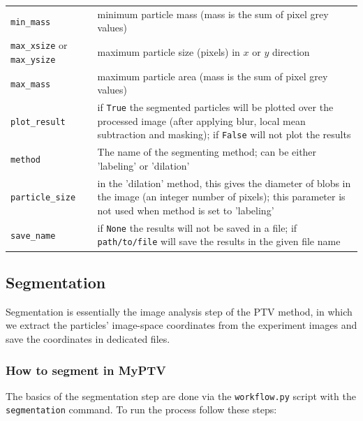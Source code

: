 \documentclass[10pt,a4paper]{article}
\begin{document}
\begin{table}[!ht]
\begin{tabular}{l m{13cm}}
		\texttt{min\_mass} & minimum particle mass (mass is the sum of pixel grey values)\\[.3em]
		
		\texttt{max\_xsize} or \texttt{max\_ysize} & maximum particle size (pixels) in $x$ or $y$ direction \\[.3em]
		
		\texttt{max\_mass} & maximum particle area (mass is the sum of pixel grey values) \\[.3em]
		
		\texttt{plot\_result} & if \texttt{True} the segmented particles will be plotted over the processed image (after applying blur, local mean subtraction and masking); if \texttt{False} will not plot the results \\[.3em]
		
		\texttt{method} & The name of the segmenting method; can be either 'labeling' or 'dilation' \\
		
		\texttt{particle\_size} & in the 'dilation' method, this gives the diameter of blobs in the image (an integer number of pixels); this parameter is not used when method is set to 'labeling' \\
		
		\texttt{save\_name} & if \texttt{None} the results will not be saved in a file; if \texttt{path/to/file} will save the results in the given file name \\
		
		\hline
	\end{tabular}
\end{table}




\subsection{Segmentation}\label{sec:workflow_segment}


Segmentation is essentially the image analysis step of the PTV method, in which we extract the particles' image-space coordinates from the experiment images and save the coordinates in dedicated files. 


\subsubsection{How to segment in MyPTV}

The basics of the segmentation step are done via the \texttt{workflow.py} script with the \texttt{segmentation} command. To run the process follow these steps:
\end{document}

